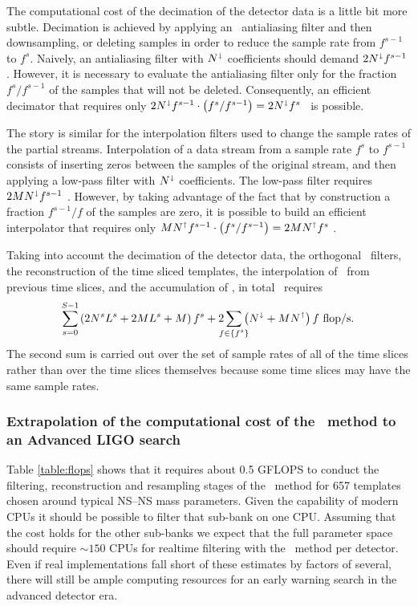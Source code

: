The computational cost of the decimation of the detector data is a little bit more subtle.  Decimation is achieved by applying an \fir\ antialiasing filter and then downsampling, or deleting samples in order to reduce the sample rate from $f^{s-1}$ to $f^s$.  Naively, an antialiasing filter with $N^\shortdownarrow$ coefficients should demand $2 N^\shortdownarrow f^{s-1}$ \flops.  However, it is necessary to evaluate the antialiasing filter only for the fraction $f^s / f^{s-1}$ of the samples that will not be deleted.  Consequently, an efficient decimator that requires only $2 N^\shortdownarrow f^{s-1} \cdot \left( f^s / f^{s-1} \right) = 2 N^\shortdownarrow f^s$ \flops\ is possible.

The story is similar for the interpolation filters used to change the sample rates of the partial \SNR{} streams.  Interpolation of a data stream from a sample rate $f^s$ to $f^{s-1}$ consists of inserting zeros between the samples of the original stream, and then applying a low-pass filter with $N^\shortdownarrow$ coefficients.  The low-pass filter requires $2 M N^\shortdownarrow f^{s-1}$ \flops.  However, by taking advantage of the fact that by construction a fraction $f^{s-1}/f$ of the samples are zero, it is possible to build an efficient interpolator that requires only $M N^\shortuparrow f^{s-1} \cdot \left( f^s / f^{s-1} \right) = 2 M N^\shortuparrow f^s$ \flops.

Taking into account the decimation of the detector data, the orthogonal \fir\ filters, the reconstruction of the time sliced templates, the interpolation of \SNR\ from previous time slices, and the accumulation of \SNR, in total \lloid\ requires
$$
\sum_{\mathclap{s=0}}^{\mathclap{S-1}} \left( 2 \slicessamps \numsvdtmps + 2 \numtmps \numsvdtmps + \numtmps \right) f^s + 2\sum_{\mathclap{f \in \{f^s\}}} \left( N^\shortdownarrow + \numtmps N^\shortuparrow \right) f \textrm{ \flops.}
$$
The second sum is carried out over the set of sample rates of all of the time slices rather than over the time slices themselves because some time slices may have the same sample rates.

\subsubsection{Extrapolation of the computational cost of the \lloid\ method to an Advanced LIGO search}

Table \ref{table:flops} shows that it requires about 0.5 GFLOPS to conduct the
filtering, reconstruction and resampling stages of the \lloid\ method for 657
templates chosen around typical NS--NS mass parameters.  Given the capability
of modern CPUs it should be possible to filter that sub-bank on one CPU.
Assuming that the cost holds for the other sub-banks we expect that the full
parameter space should require $\sim 150$ CPUs for realtime filtering with the
\lloid\ method per detector.  Even if real implementations fall short of these
estimates by factors of several, there will still be ample computing resources
for an early warning search in the advanced detector era.

